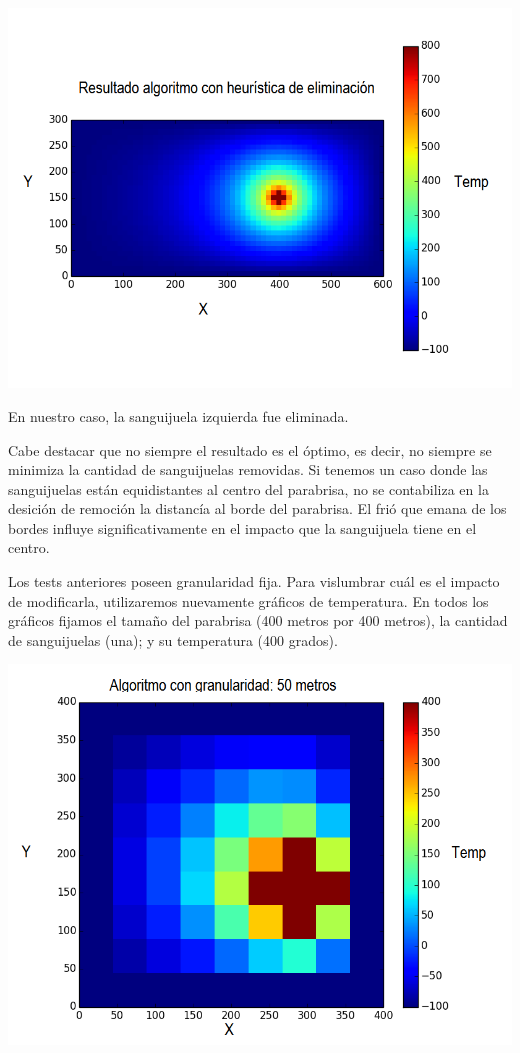 	\begin{center}
		\includegraphics[width=\textwidth]{./img/test6_conkill.png}
	\end{center}

	En nuestro caso, la sanguijuela izquierda fue eliminada.

	Cabe destacar que no siempre el resultado es el óptimo, es decir, no siempre se minimiza la cantidad de sanguijuelas removidas. Si tenemos un caso donde las sanguijuelas están equidistantes al centro del parabrisa, no se contabiliza en la desición de remoción la distancía al borde del parabrisa. El frió que emana de los bordes influye significativamente en el impacto que la sanguijuela tiene en el centro.

	Los tests anteriores poseen granularidad fija. Para vislumbrar cuál es el impacto de modificarla, utilizaremos nuevamente gráficos de temperatura. En todos los gráficos fijamos el tamaño del parabrisa (400 metros por 400 metros), la cantidad de sanguijuelas (una); y su temperatura (400 grados).

	\begin{center}
		\includegraphics[width=\textwidth]{./img/granularidad/g50_t400_sinkill.png}
	\end{center}

